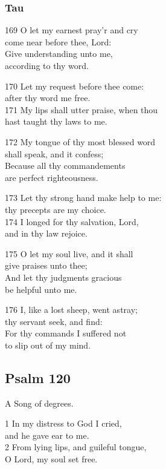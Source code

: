 \subsubsection*{Tau}

169 O let my earnest pray’r and cry\\
come near before thee, Lord:\\
Give understanding unto me,\\
according to thy word.

170 Let my request before thee come:\\
after thy word me free.\\
171 My lips shall utter praise, when thou\\
hast taught thy laws to me.

172 My tongue of thy most blessed word\\
shall speak, and it confess;\\
Because all thy commandements\\
are perfect righteousness.

173 Let thy strong hand make help to me:\\
thy precepts are my choice.\\
174 I longed for thy salvation, Lord,\\
and in thy law rejoice.

175 O let my soul live, and it shall\\
give praises unto thee;\\
And let thy judgments gracious\\
be helpful unto me.

176 I, like a lost sheep, went astray;\\
thy servant seek, and find:\\
For thy commands I suffered not\\
to slip out of my mind.

\begin{center}
\quad{}\quad{}
\end{center}


\subsection*{Psalm 120}

A Song of degrees.

1 In my distress to God I cried,\\
and he gave ear to me.\\
2 From lying lips, and guileful tongue,\\
O Lord, my soul set free.

